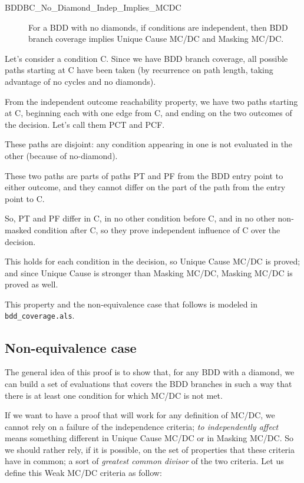 \documentclass[a4paper,12pt,twoside]{article}
\begin{document}
\begin{description}
\item[BDDBC\_No\_Diamond\_Indep\_Implies\_MCDC]
  For a BDD with no diamonds, if conditions are independent, then
  BDD branch coverage implies Unique Cause MC/DC and Masking MC/DC.
\end{description}

Let's consider a condition C. Since we have BDD branch coverage,
all possible paths starting at C have been taken (by recurrence on path
length, taking advantage of no cycles and no diamonds).

From the independent outcome reachability property, we have two paths
starting at C, beginning each with one edge from C, and ending on the
two outcomes of the decision. Let's call them PCT and PCF.

These paths are disjoint: any condition appearing in one is not evaluated
in the other (because of no-diamond).

These two paths are parts of paths PT and PF from the BDD entry point to
either outcome, and they cannot differ on the part of the path from the
entry point to C.

So, PT and PF differ in C, in no other condition before C, and in no
other non-masked condition after C, so they prove independent influence
of C over the decision.

This holds for each condition in the decision, so Unique Cause MC/DC
is proved; and since Unique Cause is stronger than Masking MC/DC,
Masking MC/DC is proved as well.

This property and the non-equivalence case that follows is modeled
in \verb|bdd_coverage.als|.

\subsection{Non-equivalence case}

The general idea of this proof is to show that, for any BDD with a
diamond, we can build a set of evaluations that covers the BDD
branches in such a way that there is at least one condition for which
MC/DC is not met.

If we want to have a proof that will work for any definition of MC/DC,
we cannot rely on a failure of the independence criteria; \textit{to
independently affect} means something different in Unique Cause MC/DC
or in Masking MC/DC. So we should rather rely, if it is possible, on
the set of properties that these criteria have in common; a sort of
\textit{greatest common divisor} of the two criteria. Let us define
this Weak MC/DC criteria as follow:
\end{document}
